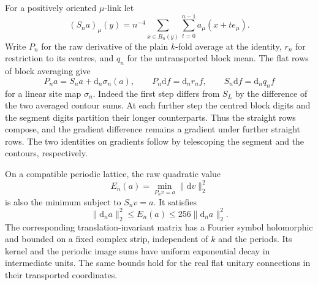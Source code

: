 \documentclass[11pt,letterpaper,reqno]{amsart}
\makeatletter
\numberwithin{equation}{section}
\theoremstyle{definition}
\newcommand{\ms@minorstart}{%
  \pushQED{\qed}\renewcommand{\qedsymbol}{$\blacksquare$}}
\newenvironment{proposition}[1][]{\ms@minorstart\ms@proposition[#1]}
  {\popQED\endms@proposition}
\theoremstyle{remark}
\makeatother
\begin{document}
For a positively oriented \(\mu\)-link let
\[
 (S_n a)_\mu(y)=n^{-4}\sum_{x\in B_n(y)}
                          \sum_{t=0}^{n-1}a_\mu(x+t e_\mu).
\]
Write \(P_n\) for the raw derivative of the plain \(k\)-fold
average at the identity, \(r_n\) for restriction to its centres,
and \(q_n\) for the untransported block mean. The flat rows of
block averaging give
\begin{equation}\label{mb:eq-flat-plain}
 P_n a=S_n a+\mathrm d_n\sigma_n(a),\qquad
 P_n\mathrm df=\mathrm d_n r_nf,\qquad
 S_n\mathrm df=\mathrm d_n q_nf
\end{equation}
for a linear site map \(\sigma_n\). Indeed the first step differs
from \(S_L\) by the difference of the two averaged contour sums.
At each further step the centred block digits and the segment
digits partition their longer counterparts. Thus the straight
rows compose, and the gradient difference remains a gradient
under further straight rows. The two identities on gradients
follow by telescoping the segment and the contours, respectively.

\begin{proposition}[The flat effective action]\label{mb:prop-flat-effective}
On a compatible periodic lattice, the raw quadratic value
\[
 E_n(a)=\min_{P_nv=a}\|\mathrm dv\|_2^2
\]
is also the minimum subject to \(S_nv=a\). It satisfies
\begin{equation}\label{mb:eq-flat-effective}
            \|\mathrm d_n a\|_2^2\le E_n(a)
                                   \le 256\|\mathrm d_n a\|_2^2 .
\end{equation}
The corresponding translation-invariant matrix has a Fourier
symbol holomorphic and bounded on a fixed complex strip,
independent of \(k\) and the periods. Its kernel and the periodic
image sums have uniform exponential decay in intermediate units.
The same bounds hold for the real flat unitary connections in
their transported coordinates.
\end{proposition}
\end{document}
